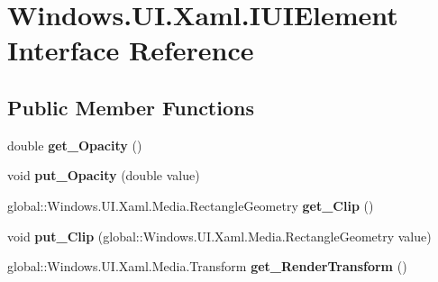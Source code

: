 \hypertarget{interface_windows_1_1_u_i_1_1_xaml_1_1_i_u_i_element}{}\section{Windows.\+U\+I.\+Xaml.\+I\+U\+I\+Element Interface Reference}
\label{interface_windows_1_1_u_i_1_1_xaml_1_1_i_u_i_element}
\subsection*{Public Member Functions}
\begin{DoxyCompactItemize}
\item 
\mbox{\label{interface_windows_1_1_u_i_1_1_xaml_1_1_i_u_i_element_ac73e763417220d829b8a2b5951828438}} 
double {\bfseries get\+\_\+\+Opacity} ()
\item 
\mbox{\label{interface_windows_1_1_u_i_1_1_xaml_1_1_i_u_i_element_a12fcaa6862ab54ca2e8c1537879d0fd8}} 
void {\bfseries put\+\_\+\+Opacity} (double value)
\item 
\mbox{\label{interface_windows_1_1_u_i_1_1_xaml_1_1_i_u_i_element_a3ac32c6dc006288e8edab536fce2cba9}} 
global\+::\+Windows.\+U\+I.\+Xaml.\+Media.\+Rectangle\+Geometry {\bfseries get\+\_\+\+Clip} ()
\item 
\mbox{\label{interface_windows_1_1_u_i_1_1_xaml_1_1_i_u_i_element_afa52f92cfbfffd55b51a14f0f3174ebb}} 
void {\bfseries put\+\_\+\+Clip} (global\+::\+Windows.\+U\+I.\+Xaml.\+Media.\+Rectangle\+Geometry value)
\item 
\mbox{\label{interface_windows_1_1_u_i_1_1_xaml_1_1_i_u_i_element_ab552e7826e0d2d6d3c836b38db536820}} 
global\+::\+Windows.\+U\+I.\+Xaml.\+Media.\+Transform {\bfseries get\+\_\+\+Render\+Transform} ()
\item 
\mbox{\label{interface_windows_1_1_u_i_1_1_xaml_1_1_i_u_i_element_ac1ee0a38d70af19ef1629dff46ef59aa}} 

\end{DoxyCompactItemize}

